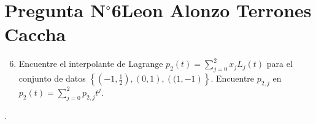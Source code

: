 \section{Pregunta N$^{\circ}$6\qquad Leon Alonzo Terrones Caccha}

\begin{frame}
	\begin{enumerate}\setcounter{enumi}{5}
		\item

		      Encuentre el interpolante de Lagrange
		      \begin{math}
			      p_{2}\left(t\right)=
			      \sum\limits_{j=0}^{2}
			      x_{j}
			      L_{j}\left(t\right)
		      \end{math}
		      para el conjunto de datos
		      \begin{math}
			      \left\{
			      \left(-1,\frac{1}{2}\right),
			      \left(0,1\right),
			      \left((1,-1\right)
			      \right\}
		      \end{math}.
		      Encuentre $p_{2,j}$ en
			  \begin{math}
				p_{2}\left(t\right)=
				\sum\limits_{j=0}^{2}
				p_{2,j}t^{j}
			  \end{math}.
	\end{enumerate}

	\begin{solution}
		.
	\end{solution}
\end{frame}
